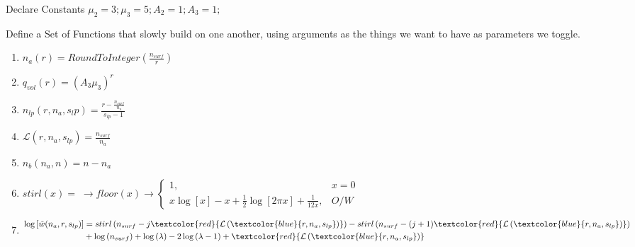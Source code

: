\documentclass[12pt,letterpaper]{article}
\newcommand{\leng}{\mathcal{L}}
\newcommand{\lr}[1]{\left( #1 \right)}
\newcommand{\lrb}[1]{\left[ #1 \right]}
\begin{document}
\begin{steps}
  \item Declare Constants 
  $\mu_2=3;\mu_3=5;A_2=1;A_3=1;$
  \item Define a Set of Functions that slowly build on one another, using arguments as the things we want to have as parameters we toggle.\\
  \begin{enumerate}
    \item
    $
        n_{a}(r)=RoundToInteger(\frac{n_{surf}}{r})
    $
    \item
    $
        q_{vol}(r)=(A_3\mu_3)^r
    $
    \item
    $
        n_{lp}(r,n_a,s_lp)=\frac{r-\frac{n_{surf}}{n_a}}{s_{lp}-1}
    $
    \item
    $
        \leng(r,n_a,s_{lp})
        =
        \frac{
        n_{surf}
        }{
        n_a
        }
    $
    \item
    $
        n_{b}(n_a,n)=n-n_a
    $
    \item
    $
        stirl(x)=\;
        \rightarrow
        floor(x)
        \rightarrow
        \left\{
        \begin{array}{lc}
             1,  &x=0 \\
             x\log\lrb{x}-x+\frac{1}{2}\log\lrb{2\pi x}+\frac{1}{12x}, &O/W              
        \end{array}
        \right.
    $
    \item
    \begin{align*}
        \log
        \lrb{
            \tilde{w}(n_a,r,s_{lp})
        }
        &=
        stirl
        \lr{
            n_{surf}
            -
            j
            \textcolor{red}{
                \leng
                \lr{
                    \textcolor{blue}{
                    r,n_a,s_{lp}
                    }
                }
            }
        }
        -
        stirl
        \lr{
            n_{surf}
            -
            (j+1)
            \textcolor{red}{
                \leng
                \lr{
                    \textcolor{blue}{
                    r,n_a,s_{lp}
                    }
                }
            }
        }\\
        &+
        \log\lr{n_{surf}}
        +
        \log\lr{\lambda}
        -
        2\log\lr{\lambda-1}
        +
        \textcolor{red}{
                \leng
                \lr{
                    \textcolor{blue}{
                    r,n_a,s_{lp}
                    }
                }
            }

\end{align*}
\end{enumerate}
\end{steps}
\end{document}
